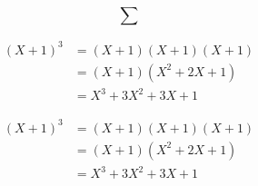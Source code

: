 \documentclass{article}
\begin{document}
	\begin{equation*} %
		\sum
	\end{equation*}
	
	\begin{align*} %
		(X+1)^3&=(X+1)(X+1)(X+1)\\
		&=(X+1)(X^2 + 2X + 1)\\
		&=X^3+3X^2+3X+1
	\end{align*}
	
	\begin{equation} %
		\begin{align*}
			(X+1)^3&=(X+1)(X+1)(X+1)\\
			&=(X+1)(X^2 + 2X + 1)\\
			&=X^3+3X^2+3X+1
		\end{align*}
	\end{equation}
\end{document}
